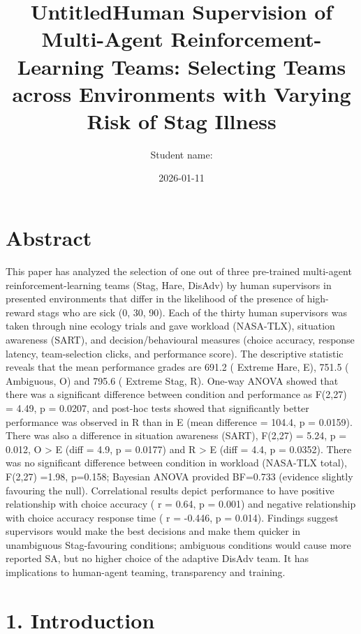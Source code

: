 \documentclass[
]{article}
\title{UntitledHuman Supervision of Multi-Agent Reinforcement-Learning
Teams: Selecting Teams across Environments with Varying Risk of Stag
Illness}
\author{Student name:}
\date{2026-01-11}
\begin{document}
\maketitle

\section{Abstract}\label{abstract}

This paper has analyzed the selection of one out of three pre-trained
multi-agent reinforcement-learning teams (Stag, Hare, DisAdv) by human
supervisors in presented environments that differ in the likelihood of
the presence of high-reward stags who are sick (0, 30, 90). Each of the
thirty human supervisors was taken through nine ecology trials and gave
workload (NASA-TLX), situation awareness (SART), and
decision/behavioural measures (choice accuracy, response latency,
team-selection clicks, and performance score). The descriptive statistic
reveals that the mean performance grades are 691.2 ( Extreme Hare, E),
751.5 ( Ambiguous, O) and 795.6 ( Extreme Stag, R). One-way ANOVA showed
that there was a significant difference between condition and
performance as F(2,27) = 4.49, p = 0.0207, and post-hoc tests showed
that significantly better performance was observed in R than in E (mean
difference = 104.4, p = 0.0159). There was also a difference in
situation awareness (SART), F(2,27) = 5.24, p = 0.012, O \textgreater{}
E (diff = 4.9, p = 0.0177) and R \textgreater{} E (diff = 4.4, p =
0.0352). There was no significant difference between condition in
workload (NASA-TLX total), F(2,27) =1.98, p=0.158; Bayesian ANOVA
provided BF=0.733 (evidence slightly favouring the null). Correlational
results depict performance to have positive relationship with choice
accuracy ( r = 0.64, p = 0.001) and negative relationship with choice
accuracy response time ( r = -0.446, p = 0.014). Findings suggest
supervisors would make the best decisions and make them quicker in
unambiguous Stag-favouring conditions; ambiguous conditions would cause
more reported SA, but no higher choice of the adaptive DisAdv team. It
has implications to human-agent teaming, transparency and training.

\section{1. Introduction}\label{introduction}
\end{document}
